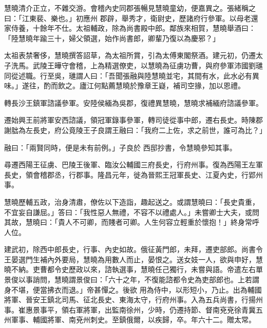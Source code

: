 \begin{pinyinscope}
 慧曉清介正立，不雜交游。會稽內史同郡張暢見慧曉童幼，便嘉異之。張緒稱之曰：「江東裴、樂也。」初應州
 郡辟，舉秀才，衛尉史，歷諸府行參軍。以母老還家侍養，十餘年不仕。太祖輔政，除為尚書殿中郎。鄰族來相賀，慧曉舉酒曰：「陸慧曉年踰三十，婦父領選，始作尚書郎，卿輩乃復以為慶邪？」



 太祖表禁奢侈，慧曉撰答詔草，為太祖所賞，引為太傅東閣祭酒。建元初，仍遷太子洗馬。武陵王曄守會稽，上為精選僚吏，以慧曉為征虜功曹，與府參軍沛國劉璡同從述職。行至吳，璡謂人曰：「吾聞張融與陸慧曉並宅，其間有水，此水必有異味。」遂往，酌而飲之。廬江何點薦慧曉於豫章王嶷，補司空掾，加以恩禮。



 轉長沙王鎮軍諮議參軍。安陸侯緬為吳郡，復禮異慧曉，慧曉求補緬府諮議參軍。



 遷始興王前將軍安西諮議，領冠軍錄事參軍，轉司徒從事中郎，遷右長史。時陳郡謝朏為左長史，府公竟陵王子良謂王融曰：「我府二上佐，求之前世，誰可為比？」



 融曰：「兩賢同時，便是未有前例。」子良於
 西邸抄書，令慧曉參知其事。



 尋遷西陽王征虜、巴陵王後軍、臨汝公輔國三府長史，行府州事。復為西陽王左軍長史，領會稽郡丞，行郡事。隆昌元年，徙為晉熙王冠軍長史、江夏內史，行郢州事。



 慧曉歷輔五政，治身清肅，僚佐以下造詣，趣起送之。或謂慧曉曰：「長史貴重，不宜妄自謙屈。」答曰：「我性惡人無禮，不容不以禮處人。」未嘗卿士大夫，或問其故，慧曉曰：「貴人不可卿，而賤者可卿。人生何容立輕重於懷抱！」終身常呼人位。



 建武初，除西中郎長史，行事、內史如故。俄征黃門郎，未拜，遷吏部郎。尚書令王晏選門生補內外要局，慧曉為用數人而止，晏恨之。送女妓一人，欲與申好，慧曉不納。吏曹都令史歷政以來，諮執選事，慧曉任己獨行，未嘗與語。帝遣左右單景俊以事誚問，慧曉謂景俊曰：「六十之年，不復能諮都令史為吏部郎也。上若謂身不堪，便當拂衣而退。」帝甚憚之。後欲
 用為侍中，以形短小，乃止。出為輔國將軍、晉安王鎮北司馬、征北長史、東海太守，行府州事。入為五兵尚書，行揚州事。崔惠景事平，領右軍將軍，出監南徐州，少時，仍遷持節、督南兗兗徐青冀五州軍事、輔國將軍、南兗州刺史。至鎮俄爾，以疾歸，卒。年六十二。贈太常。




\end{pinyinscope}
